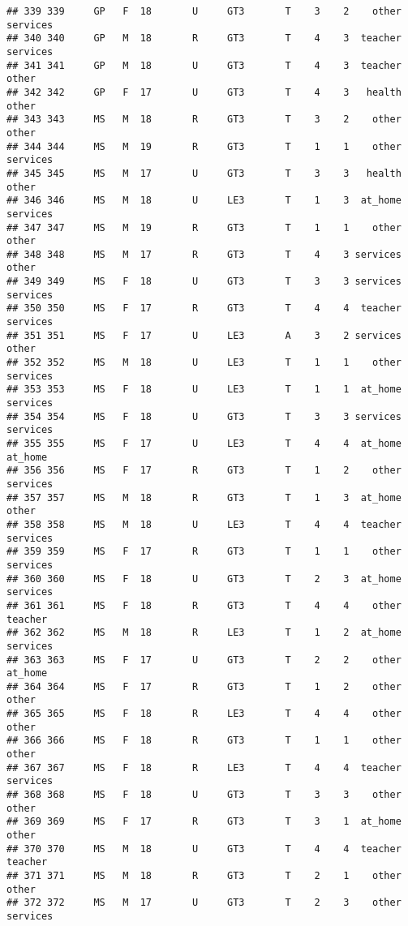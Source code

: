 \documentclass[]{article}
\begin{document}
\begin{verbatim}
## 339 339     GP   F  18       U     GT3       T    3    2    other services
## 340 340     GP   M  18       R     GT3       T    4    3  teacher services
## 341 341     GP   M  18       U     GT3       T    4    3  teacher    other
## 342 342     GP   F  17       U     GT3       T    4    3   health    other
## 343 343     MS   M  18       R     GT3       T    3    2    other    other
## 344 344     MS   M  19       R     GT3       T    1    1    other services
## 345 345     MS   M  17       U     GT3       T    3    3   health    other
## 346 346     MS   M  18       U     LE3       T    1    3  at_home services
## 347 347     MS   M  19       R     GT3       T    1    1    other    other
## 348 348     MS   M  17       R     GT3       T    4    3 services    other
## 349 349     MS   F  18       U     GT3       T    3    3 services services
## 350 350     MS   F  17       R     GT3       T    4    4  teacher services
## 351 351     MS   F  17       U     LE3       A    3    2 services    other
## 352 352     MS   M  18       U     LE3       T    1    1    other services
## 353 353     MS   F  18       U     LE3       T    1    1  at_home services
## 354 354     MS   F  18       U     GT3       T    3    3 services services
## 355 355     MS   F  17       U     LE3       T    4    4  at_home  at_home
## 356 356     MS   F  17       R     GT3       T    1    2    other services
## 357 357     MS   M  18       R     GT3       T    1    3  at_home    other
## 358 358     MS   M  18       U     LE3       T    4    4  teacher services
## 359 359     MS   F  17       R     GT3       T    1    1    other services
## 360 360     MS   F  18       U     GT3       T    2    3  at_home services
## 361 361     MS   F  18       R     GT3       T    4    4    other  teacher
## 362 362     MS   M  18       R     LE3       T    1    2  at_home services
## 363 363     MS   F  17       U     GT3       T    2    2    other  at_home
## 364 364     MS   F  17       R     GT3       T    1    2    other    other
## 365 365     MS   F  18       R     LE3       T    4    4    other    other
## 366 366     MS   F  18       R     GT3       T    1    1    other    other
## 367 367     MS   F  18       R     LE3       T    4    4  teacher services
## 368 368     MS   F  18       U     GT3       T    3    3    other    other
## 369 369     MS   F  17       R     GT3       T    3    1  at_home    other
## 370 370     MS   M  18       U     GT3       T    4    4  teacher  teacher
## 371 371     MS   M  18       R     GT3       T    2    1    other    other
## 372 372     MS   M  17       U     GT3       T    2    3    other services

\end{verbatim}
\end{document}
